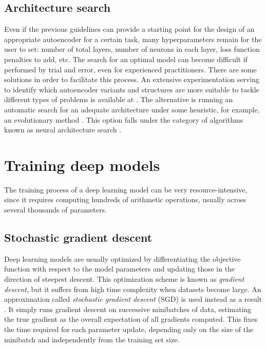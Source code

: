 \subsection{Architecture search} 

Even if the previous guidelines can provide a starting point for the design of an appropriate autoencoder for a certain task, many hyperparameters remain for the user to set: number of total layers, number of neurons in each layer, loss function penalties to add, etc. The search for an optimal model can become difficult if performed by trial and error, even for experienced practitioners. There are some solutions in order to facilitate this process. An extensive experimentation serving to identify which autoencoder variants and structures are more suitable to tackle different types of problems is available at . The alternative is running an automatic search for an adequate architecture under some heuristic, for example, an evolutionary method . This option falls under the category of algorithms known as neural architecture search .


\section{Training deep models}

The training process of a deep learning model can be very resource-intensive, since it requires computing hundreds of arithmetic operations, usually across several thousands of parameters. 

\subsection{Stochastic gradient descent}

Deep learning models are usually optimized by differentiating the objective function with respect to the model parameters and updating those in the direction of steepest descent. This optimization scheme is known as \textit{gradient descent}, but it suffers from high time complexity when datasets become large. An approximation called \textit{stochastic gradient descent} (SGD) is used instead as a result . It simply runs gradient descent on successive minibatches of data, estimating the true gradient as the overall expectation of all gradients computed. This fixes the time required for each parameter update, depending only on the size of the minibatch and independently from the training set size.

